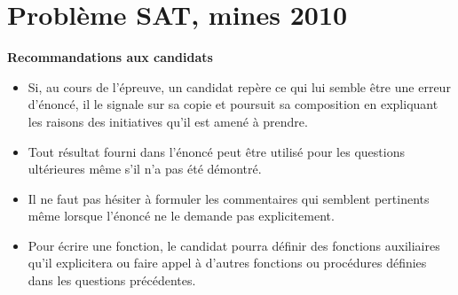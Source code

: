 
\usepackage{enumitem}
\def\numero{02}
\def\classe{Option info MP1}
\def\max{\text{\rm max}}
\def\val{\text{\rm val}}
\def\diff{\text{\rm diff}}

\camltrue

\chapter{Problème SAT, mines 2010}
{\bf Recommandations aux candidats}
\begin{itemize}
\item Si, au cours de l’épreuve, un candidat repère ce qui lui semble être une erreur d’énoncé, il le signale sur sa copie et poursuit sa composition en expliquant les raisons des initiatives qu’il est amené à prendre.
\item Tout résultat fourni dans l’énoncé peut être utilisé pour les questions ultérieures même s’il n’a pas été démontré.
\item Il ne faut pas hésiter à formuler les commentaires qui semblent pertinents même
lorsque l’énoncé ne le demande pas explicitement.
\item Pour écrire une fonction, le candidat pourra définir des fonctions auxiliaires qu’il explicitera ou faire appel à d’autres fonctions ou procédures définies dans les questions précédentes.
\end{itemize}

\medskip

